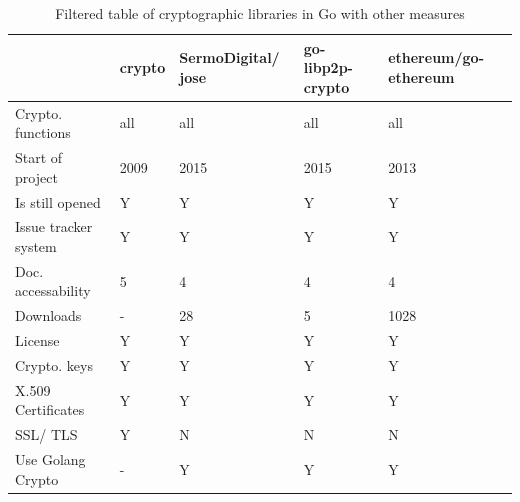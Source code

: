 \documentclass[
  digital, %
  notable,   %
  lof,     %
  lot,     %
]{fithesis3}
\begin{document}
\begin{table}[th]
\begin{tabular}{|P{2.3cm}|P{1.1cm} P{2.4cm} P{2.4cm} P{2.4cm}|}
\hline
 & crypto & SermoDigital/ jose & go-libp2p-crypto & ethereum/go-ethereum \\ [2ex]
\hline
Crypto. functions & all & all & all & all \\ [4ex]
Start of project & 2009 & 2015 & 2015 & 2013 \\ [4ex]
Is still opened & Y & Y & Y & Y \\ [4ex]
Issue tracker system & Y & Y & Y & Y \\ [4ex]
Doc. accessability & 5 & 4 & 4 & 4 \\ [4ex]
Downloads & - & 28 & 5 & 1028 \\ [2ex]
License & Y & Y & Y & Y \\ [2ex]
Crypto. keys & Y & Y & Y & Y \\ [4ex]
X.509 Certificates & Y & Y & Y & Y \\ [4ex]
SSL/ TLS & Y & N & N & N \\ [2ex]
Use Golang Crypto & - & Y & Y & Y \\ [4ex]
\hline
\end{tabular}
\caption{Filtered table of cryptographic libraries in Go with other measures} 
\label{table:analysis23} 
\end{table}





\printbibliography
\end{document}
